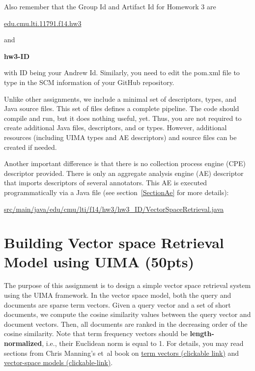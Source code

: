 \documentclass[oneside,11pt]{memoir}
\begin{document}
Also remember that the Group Id and Artifact Id for Homework 3 are

\begin{center}
\url{edu.cmu.lti.11791.f14.hw3}
\end{center}

and 

\begin{center}\textbf{hw3-ID }\end{center}
with ID being your Andrew Id.
Similarly, you need to edit the pom.xml file to type in the SCM information of
your GitHub repository. 

Unlike other assignments, 
we include a minimal set of descriptors, types, and Java source files.
This set of files defines a complete pipeline. 
The code should compile and run, but it does nothing useful, yet.
Thus, you are not required
to create additional Java files, descriptors, and or types.
However, additional resources (including UIMA types 
and AE descriptors) and source files can be created if needed.

Another important difference is that there is no collection process engine (CPE) descriptor provided.
There is only an aggregate analysis engine (AE) descriptor that imports descriptors of several annotators.
This AE is executed programmatically via a Java file (see section~\ref{SectionAe} for more details):

\begin{center}\url{src/main/java/edu/cmu/lti/f14/hw3/hw3_ID/VectorSpaceRetrieval.java} \end{center}

\chapter{Building Vector space Retrieval Model using UIMA (50pts)}
\label{SectionBuildVS}

The purpose of this assignment is to design a simple vector space retrieval system using the UIMA
framework. 
In the vector space model,
both the query and documents are sparse term vectors.
Given a query vector and a set of short documents, 
we compute the cosine similarity values between the query vector and document vectors.
Then, all documents are ranked in the decreasing order of the cosine similarity.
Note that term frequency vectors should be \textbf{length-normalized}, i.e., their
Euclidean norm is equal to 1. For details, you may read
sections from Chris Manning's et~al book on \href{http://nlp.stanford.edu/IR-book/html/htmledition/term-frequency-and-weighting-1.html#sec:secbagofwords}{term vectors (clickable link)} and \href{http://nlp.stanford.edu/IR-book/html/htmledition/the-vector-space-model-for-scoring-1.html}{vector-space models (clickable-link)}.
\end{document}
